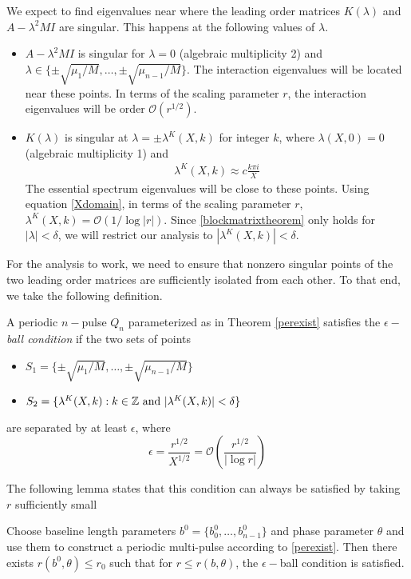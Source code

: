\documentclass[thesis.tex]{subfiles}
\begin{document}
We expect to find eigenvalues near where the leading order matrices $K(\lambda)$ and $A - \lambda^2 MI$ are singular. This happens at the following values of $\lambda$. 
\begin{itemize}
	\item $A - \lambda^2 M I$ is singular for $\lambda = 0$ (algebraic multiplicity 2) and $\lambda \in \{ \pm \sqrt{\mu_1/M}, \dots, \pm \sqrt{\mu_{n-1}/M}\}$. The interaction eigenvalues will be located near these points.	In terms of the scaling parameter $r$, the interaction eigenvalues will be order $\mathcal{O}(r^{1/2})$.

	\item $K(\lambda)$ is singular at $\lambda = \pm \lambda^K(X,k)$ for integer $k$, where $\lambda(X, 0) = 0$ (algebraic multiplicity 1) and
	\begin{align}\label{lambdaXkapprox}
	\lambda^K(X,k) \approx c \frac{k \pi i }{X} 
	\end{align}
	The essential spectrum eigenvalues will be close to these points. Using equation \cref{Xdomain}, in terms of the scaling parameter $r$, $\lambda^K(X,k) = \mathcal{O}(1/\log|r|)$. Since \cref{blockmatrixtheorem} only holds for $|\lambda| < \delta$, we will restrict our analysis to $|\lambda^K(X,k)| < \delta$.
\end{itemize}  

For the analysis to work, we need to ensure that nonzero singular points of the two leading order matrices are sufficiently isolated from each other. To that end, we take the following definition.

\begin{definition}\label{epsilonballs}
A periodic $n-$pulse $Q_n$ parameterized as in Theorem \ref{perexist} satisfies the \emph{$\epsilon-$ball condition} if the two sets of points 
\begin{itemize}
\item $S_1 = \{ \pm \sqrt{\mu_1/M}, \dots, \pm \sqrt{\mu_{n-1}/M} \}$
\item $S_2 = \{ \lambda^K(X,k) : k \in \mathbb{Z} \text{ and } |\lambda^K(X,k)| < \delta \}$
\end{itemize}
are separated by at least $\epsilon$, where
\[
\epsilon = \frac{r^{1/2}}{X^{1/2}} = \mathcal{O} \left( \frac{r^{1/2}}{|\log r| } \right)
\]
\end{definition}

The following lemma states that this condition can always be satisfied by taking $r$ sufficiently small

\begin{lemma}\label{epsilonballlemma}
Choose baseline length parameters $b^0 = \{ b_0^0, \dots, b_{n-1}^0 \}$ and phase parameter $\theta$ and use them to construct a periodic multi-pulse according to \cref{perexist}. Then there exists $r(b^0, \theta) \leq r_0$ such that for $r \leq r(b, \theta)$, the $\epsilon-$ball condition is satisfied.
\end{lemma} 
\end{document}
